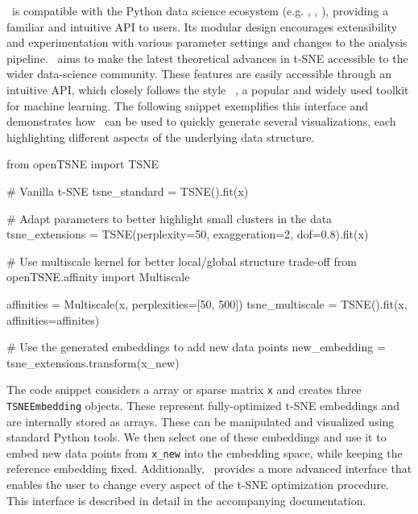\documentclass[article]{jss}
\newcommand{\opentsne}{\pkg{openTSNE}}
\begin{document}
\opentsne\ is compatible with the Python data science ecosystem (e.g.
, , ), providing a familiar
and intuitive API to users. Its modular design encourages extensibility and
experimentation with various parameter settings and changes to the analysis
pipeline. \opentsne\ aims to make the latest theoretical advances in t-SNE
accessible to the wider data-science community. These features are easily
accessible through an intuitive API, which closely follows the style
~\citep{sklearn_api}, a popular and widely used toolkit for
machine learning. The following snippet exemplifies this interface and
demonstrates how \opentsne\ can be used to quickly generate several
visualizations, each highlighting different aspects of the underlying data
structure.
\begin{CodeChunk}
\begin{CodeInput}
from openTSNE import TSNE

# Vanilla t-SNE
tsne_standard = TSNE().fit(x)

# Adapt parameters to better highlight small clusters in the data
tsne_extensions = TSNE(perplexity=50, exaggeration=2, dof=0.8).fit(x)

# Use multiscale kernel for better local/global structure trade-off
from openTSNE.affinity import Multiscale

affinities = Multiscale(x, perplexities=[50, 500])
tsne_multiscale = TSNE().fit(x, affinities=affinites)

# Use the generated embeddings to add new data points
new_embedding = tsne_extensions.transform(x_new)
\end{CodeInput}
\end{CodeChunk}
The code snippet considers a  array or  sparse
matrix \texttt{x} and creates three \texttt{TSNEEmbedding} objects. These
represent fully-optimized t-SNE embeddings and are internally stored as 
arrays. These can be manipulated and visualized using standard Python tools. We
then select one of these embeddings and use it to embed new data points from
\texttt{x\_new} into the embedding space, while keeping the reference embedding
fixed. Additionally, \opentsne\ provides a more advanced interface that enables
the user to change every aspect of the t-SNE optimization procedure. This
interface is described in detail in the accompanying documentation.


\end{document}
